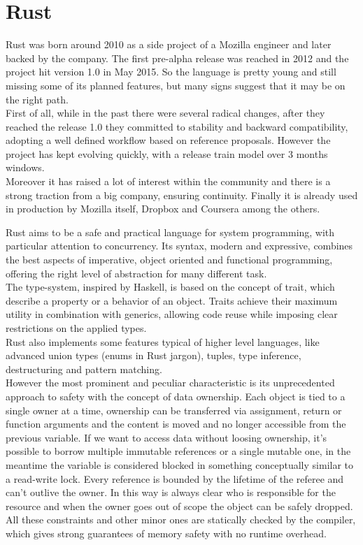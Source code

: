 \section{Rust}
Rust was born around 2010 as a side project of a Mozilla engineer and later backed by the company. The first pre-alpha release was reached in 2012 and the project hit version 1.0 in May 2015. So the language is pretty young and still missing some of its planned features, but many signs suggest that it may be on the right path.\\
First of all, while in the past there were several radical changes, after they reached the release 1.0 they committed to stability and backward compatibility, adopting a well defined workflow based on reference proposals. However the project has kept evolving quickly, with a release train model over 3 months windows.\\
Moreover it has raised a lot of interest within the community and there is a strong traction from a big company, ensuring continuity. Finally it is already used in production by Mozilla itself, Dropbox and Coursera among the others.

Rust aims to be a safe and practical language for system programming, with particular attention to concurrency. Its syntax, modern and expressive, combines the best aspects of imperative, object oriented and functional programming, offering the right level of abstraction for many different task.\\
The type-system, inspired by Haskell, is based on the concept of trait, which describe a property or a behavior of an object. Traits achieve their maximum utility in combination with generics, allowing code reuse while imposing clear restrictions on the applied types.\\
Rust also implements some features typical of higher level languages, like advanced union types (enums in Rust jargon), tuples, type inference, destructuring and pattern matching.\\
However the most prominent and peculiar characteristic is its unprecedented approach to safety with the concept of data ownership. Each object is tied to a single owner at a time, ownership can be transferred via assignment, return or function arguments and the content is moved and no longer accessible from the previous variable. If we want to access data without loosing ownership, it's possible to borrow multiple immutable references or a single mutable one, in the meantime the variable is considered blocked in something conceptually similar to a read-write lock. Every reference is bounded by the lifetime of the referee and can't outlive the owner. In this way is always clear who is responsible for the resource and when the owner goes out of scope the object can be safely dropped.\\
All these constraints and other minor ones are statically checked by the compiler, which gives strong guarantees of memory safety with no runtime overhead.

